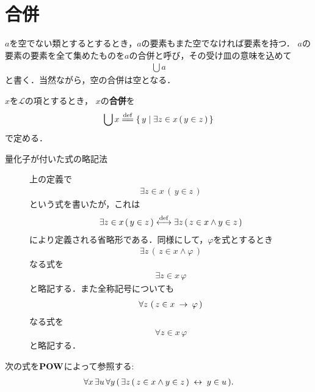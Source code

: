 \section{合併}
	$a$を空でない類とするとするとき，$a$の要素もまた空でなければ要素を持つ．
	$a$の要素の要素を全て集めたものを$a$の合併と呼び，その受け皿の意味を込めて
	\begin{align}
		\bigcup a
	\end{align}
	と書く．当然ながら，空の合併は空となる．
	
	\begin{screen}
		\begin{dfn}[合併]
			$x$を$\mathcal{L}$の項とするとき，
			$x$の{\bf 合併}を
			\begin{align}
				\bigcup x \defeq \Set{y}{\exists z \in x\, (\, y \in z\, )}
				\label{eq:definition_of_union_1}
			\end{align}
			で定める．
		\end{dfn}
	\end{screen}
	
	\begin{description}
		\item[量化子が付いた式の略記法]
		上の定義で
		\begin{align}
			\exists z \in x\, (\, y \in z\, )
		\end{align}
		という式を書いたが，これは
		\begin{align}
			\exists z \in x\, (\, y \in z\, ) \overset{\mathrm{def}}{\longleftrightarrow} 
			\exists z\, (\, z \in x \wedge y \in z\, )
		\end{align}
		により定義される省略形である．同様にして，$\varphi$を式とするとき
		\begin{align}
			\exists z\, \left(\, z \in x \wedge \varphi\, \right)
		\end{align}
		なる式を
		\begin{align}
			\exists z \in x\, \varphi
		\end{align}
		と略記する．また全称記号についても
		\begin{align}
			\forall z\, \left(\, z \in x \hspace{0.25em}\rightarrow\hspace{0.25em} \varphi\, \right)
		\end{align}
		なる式を
		\begin{align}
			\forall z \in x\, \varphi
		\end{align}
		と略記する．
	\end{description}
	
	\begin{screen}
		\begin{axm}[合併の公理]
			次の式を$\mbox{{\bf POW}}$によって参照する:
			\begin{align}
				\forall x\, \exists u\, \forall y\, (\, \exists z\, (\, z \in x \wedge y \in z\, ) \hspace{0.25em}\leftrightarrow\hspace{0.25em} y \in u\, ).
			\end{align}
		\end{axm}
	\end{screen}
	
